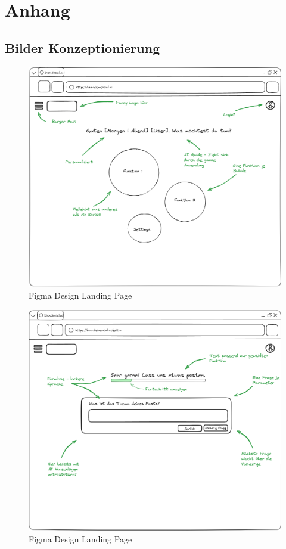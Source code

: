 \section{Anhang}\label{sec:anhang}
\subsection{Bilder Konzeptionierung}\label{subsec:bilder-konzeptionierung}

\begin{figure}[htbp]
    \centering
    \includegraphics[width=\textwidth]{abbildungen/Konzept/Konzept Landing Page}
    \caption{Figma Design Landing Page}
    \label{fig:landing-page-concept}
\end{figure}
\newpage

\begin{figure}[htbp]
    \centering
    \includegraphics[width=\textwidth]{abbildungen/Konzept/Konzept Dialog}
    \caption{Figma Design Landing Page}
    \label{fig:dialog-concept}
\end{figure}
\newpage


